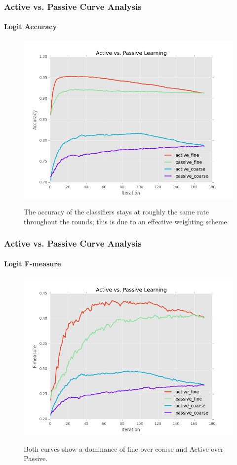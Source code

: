 \documentclass{beamer}
\begin{document}
\begin{frame}[noframenumbering]
    \frametitle{Active vs. Passive Curve Analysis}
    \framesubtitle{Logit Accuracy}
    \begin{figure}[!htb]
        \centering
        \includegraphics[width=0.80\columnwidth]{fig/runActPassLogReg_acc}
        \label{fig:runActPassLogReg_acc}
        \caption{The accuracy of the classifiers stays at
roughly the same rate throughout the rounds; this is due to an effective
weighting scheme.}
    \end{figure}
\end{frame}
\begin{frame}[noframenumbering]
    \frametitle{Active vs. Passive Curve Analysis}
    \framesubtitle{Logit F-measure}
    \begin{figure}[!htb]
        \centering
        \includegraphics[width=0.70\columnwidth]{fig/runActPassLogReg_f1}
        \label{fig:runActPassLogReg_f1}
        \caption{Both curves show a dominance of fine over coarse and
Active over Passive.}
    \end{figure}
\end{frame}
\end{document}
